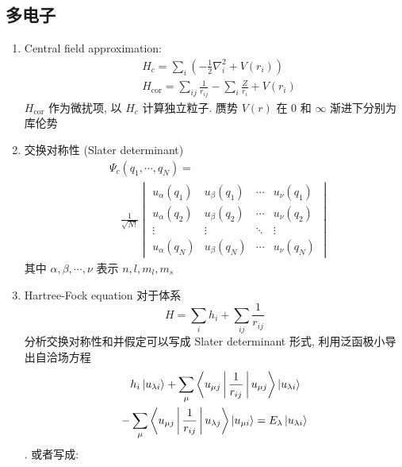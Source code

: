 \documentclass[10pt,a4paper,twocolumn]{article} %
\numberwithin{equation}{section} %
\begin{document}
\subsection{多电子} %
\label{sub:multi_elec}
\begin{enumerate}
	\item Central field approximation: 
	\begin{equation}
	\begin{split}
		&H_c = \sum_i \left(-\frac 12 \nabla_i^2 + V(r_i)\right)\\
		&H_{\mathrm{cor}} = \sum_{ij} \frac 1{r_{ij}} - \sum_i \frac Z{r_i} + V(r_i)
	\end{split}
	\end{equation}
	$H_{\mathrm{cor}}$ 作为微扰项, 以 $H_c$ 计算独立粒子. 赝势 $V(r)$ 在 $0$ 和
	$\infty$ 渐进下分别为库伦势
	\item 交换对称性 (Slater determinant)
	\begin{equation}
	\begin{split}
		&\Psi_c(q_1, \cdots, q_N) = \\
		&\quad\frac{1}{\sqrt{N!}}\begin{vmatrix}
			u_\alpha(q_1) & u_\beta(q_1) & \cdots & u_\nu(q_1) \\
			u_\alpha(q_2) & u_\beta(q_2) & \cdots & u_\nu(q_2) \\
			\vdots & \vdots & \ddots & \vdots \\
			u_\alpha(q_N) & u_\beta(q_N) & \cdots & u_\nu(q_N)
		\end{vmatrix}
	\end{split}
	\end{equation}
	其中 $\alpha, \beta, \cdots, \nu$ 表示 $n, l, m_l, m_s$
	\item Hartree-Fock equation
	对于体系
	\begin{equation}
		H = \sum_i h_i + \sum_{ij} \frac 1{r_{ij}}
	\end{equation}
	分析交换对称性和并假定可以写成 Slater determinant 形式, 
	利用泛函极小导出自洽场方程
	\begin{equation}
	\begin{split}
		&h_i \ket{u_{\lambda i}} + 
		\sum_\mu\Braket{u_{\mu j}|\frac{1}{r_{ij}}|u_{\mu j}}
		\ket{u_{\lambda i}}\\
		-& \sum_\mu \Braket{u_{\mu j}|\frac{1}{r_{ij}}|
		u_{\lambda j}}\ket{u_{\mu i}} = E_\lambda \ket{u_{\lambda i}}
	\end{split}
	\end{equation}.
	或者写成: 
	\begin{equation}

\end{equation}
\end{enumerate}
\end{document}
